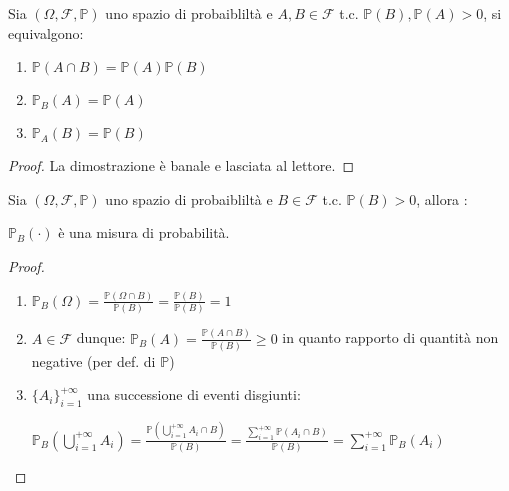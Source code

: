 \begin{proposition}
    Sia $(\Omega,\mathscr{F},\mathbb{P})$ uno spazio di probaibliltà e $A,B\in\mathscr{F}$ t.c. $\mathbb{P}(B),\mathbb{P}(A)>0$, si equivalgono:
    \begin{enumerate}
        \item $\mathbb{P}(A\cap B)=\mathbb{P}(A)\mathbb{P}(B)$
        \item $\mathbb{P}_B(A)=\mathbb{P}(A)$
        \item $\mathbb{P}_A(B)=\mathbb{P}(B)$
    \end{enumerate}
    \begin{proof}
    
La dimostrazione è banale e lasciata al lettore.
    \end{proof}
\end{proposition}

\vspace{5px}

\begin{proposition}
    Sia $(\Omega,\mathscr{F},\mathbb{P})$ uno spazio di probaibliltà e $B\in\mathscr{F}$ t.c. 
    \newline
    $\mathbb{P}(B)>0$, allora :
    \begin{center}
        $\mathbb{P}_B(\cdot)$ è una misura di probabilità.
    \end{center}
    \vspace{5px}
\begin{proof}
\begin{enumerate}
    \item $\mathbb{P}_B(\Omega)=${\large$\frac{\mathbb{P}(\Omega\cap B)}{\mathbb{P}(B)}=\frac{\mathbb{P}(B)}{\mathbb{P}(B)}=1$}
    \item $A\in\mathscr{F}$ dunque: $\mathbb{P}_B(A)=${\large$\frac{\mathbb{P}(A\cap B)}{\mathbb{P}(B)}$}$\geq0$ in quanto rapporto di quantità non negative (per def. di $\mathbb{P}$)
    \item $\{{A_i}\}_{i=1}^{+\infty}$ una successione di eventi disgiunti: 
    \begin{center}
        $\mathbb{P}_B(\bigcup\limits_{i=1}^{+\infty}{A_i})=${\large$\frac{\mathbb{P}(\bigcup\limits_{i=1}^{+\infty}{A_i}\cap B)}{\mathbb{P}(B)}=\frac{\sum\limits_{i=1}^{+\infty}\mathbb{P}(A_i\cap B)}{\mathbb{P}(B)}$}$=\sum\limits_{i=1}^{+\infty}\mathbb{P}_B(A_i)$
    \end{center}
\end{enumerate}
\end{proof}    
\end{proposition}
\vspace{5px}

